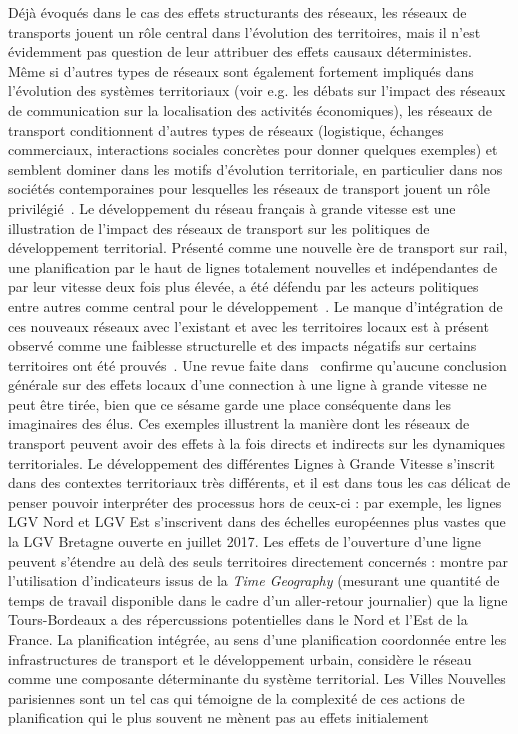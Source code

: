 {Déjà évoqués dans le cas des effets structurants des réseaux, les réseaux de transports jouent un rôle central dans l'évolution des territoires, mais il n'est évidemment pas question de leur attribuer des effets causaux déterministes. Même si d'autres types de réseaux sont également fortement impliqués dans l'évolution des systèmes territoriaux (voir e.g. les débats sur l'impact des réseaux de communication sur la localisation des activités économiques), les réseaux de transport conditionnent d'autres types de réseaux (logistique, échanges commerciaux, interactions sociales concrètes pour donner quelques exemples) et semblent dominer dans les motifs d'évolution territoriale, en particulier dans nos sociétés contemporaines pour lesquelles les réseaux de transport jouent un rôle privilégié~\cite{bavoux2005geographie}. Le développement du réseau français à grande vitesse est une illustration de l'impact des réseaux de transport sur les politiques de développement territorial. Présenté comme une nouvelle ère de transport sur rail, une planification par le haut de lignes totalement nouvelles et indépendantes de par leur vitesse deux fois plus élevée, a été défendu par les acteurs politiques entre autres comme central pour le développement~\cite{zembri1997fondements}. Le manque d'intégration de ces nouveaux réseaux avec l'existant et avec les territoires locaux est à présent observé comme une faiblesse structurelle et des impacts négatifs sur certains territoires ont été prouvés~\cite{zembri2008contribution}. Une revue faite dans~\cite{bazin2011grande} confirme qu'aucune conclusion générale sur des effets locaux d'une connection à une ligne à grande vitesse ne peut être tirée, bien que ce sésame garde une place conséquente dans les imaginaires des élus. Ces exemples illustrent la manière dont les réseaux de transport peuvent avoir des effets à la fois directs et indirects sur les dynamiques territoriales. Le développement des différentes Lignes à Grande Vitesse s'inscrit dans des contextes territoriaux très différents, et il est dans tous les cas délicat de penser pouvoir interpréter des processus hors de ceux-ci : par exemple, les lignes LGV Nord et LGV Est s'inscrivent dans des échelles européennes plus vastes que la LGV Bretagne ouverte en juillet 2017. Les effets de l'ouverture d'une ligne peuvent s'étendre au delà des seuls territoires directement concernés : \cite{l2014contribution} montre par l'utilisation d'indicateurs issus de la \emph{Time Geography} (mesurant une quantité de temps de travail disponible dans le cadre d'un aller-retour journalier) que la ligne Tours-Bordeaux a des répercussions potentielles dans le Nord et l'Est de la France. La planification intégrée, au sens d'une planification coordonnée entre les infrastructures de transport et le développement urbain, considère le réseau comme une composante déterminante du système territorial. Les Villes Nouvelles parisiennes sont un tel cas qui témoigne de la complexité de ces actions de planification qui le plus souvent ne mènent pas au effets initialement }
